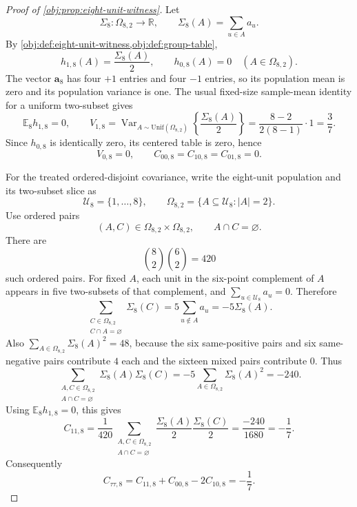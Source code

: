\documentclass[11pt]{article}
\begin{document}
\begin{proof}[Proof of \cref{obj:prop:eight-unit-witness}]
Let
\[
\Sigma_8:\Omega_{8,2}\to\mathbb R,
\qquad
\Sigma_8(A)=\sum_{u\in A} a_u .
\]
By \cref{obj:def:eight-unit-witness,obj:def:group-table},
\[
h_{1,8}(A)=\frac{\Sigma_8(A)}{2},
\qquad
h_{0,8}(A)=0
\quad (A\in\Omega_{8,2}).
\]
The vector \(\mathbf a_8\) has four \(+1\) entries and four \(-1\) entries, so its population mean is zero and its population variance is one. The usual fixed-size sample-mean identity for a uniform two-subset gives
\[
\mathbb E_8 h_{1,8}=0,
\qquad
V_{1,8}
=
\operatorname{Var}_{A\sim\mathrm{Unif}(\Omega_{8,2})}
  \left\{\frac{\Sigma_8(A)}{2}\right\}
=
\frac{8-2}{2(8-1)}\cdot 1
=
\frac{3}{7}.
\]
Since \(h_{0,8}\) is identically zero, its centered table is zero, hence
\[
V_{0,8}=0,
\qquad
C_{00,8}=C_{10,8}=C_{01,8}=0 .
\]

For the treated ordered-disjoint covariance, write the eight-unit population and its two-subset slice as
\[
\mathcal U_8=\{1,\ldots,8\},
\qquad
\Omega_{8,2}=\{A\subseteq\mathcal U_8: |A|=2\}.
\]
Use ordered pairs
\[
(A,C)\in\Omega_{8,2}\times\Omega_{8,2},
\qquad
A\cap C=\varnothing .
\]
There are
\[
\binom82\binom62=420
\]
such ordered pairs. For fixed \(A\), each unit in the six-point complement of \(A\) appears in five two-subsets of that complement, and \(\sum_{u\in\mathcal U_8}a_u=0\). Therefore
\[
\sum_{\substack{C\in\Omega_{8,2}\\ C\cap A=\varnothing}}\Sigma_8(C)
=
5\sum_{u\notin A}a_u
=
-5\Sigma_8(A).
\]
Also \(\sum_{A\in\Omega_{8,2}}\Sigma_8(A)^2=48\), because the six same-positive pairs and six same-negative pairs contribute \(4\) each and the sixteen mixed pairs contribute \(0\). Thus
\[
\sum_{\substack{A,C\in\Omega_{8,2}\\ A\cap C=\varnothing}}
\Sigma_8(A)\Sigma_8(C)
=
-5\sum_{A\in\Omega_{8,2}}\Sigma_8(A)^2
=
-240.
\]
Using \(\mathbb E_8h_{1,8}=0\), this gives
\[
C_{11,8}
=
\frac1{420}
\sum_{\substack{A,C\in\Omega_{8,2}\\ A\cap C=\varnothing}}
\frac{\Sigma_8(A)}2\frac{\Sigma_8(C)}2
=
\frac{-240}{1680}
=
-\frac17 .
\]
Consequently
\[
C_{\tau\tau,8}
=
C_{11,8}+C_{00,8}-2C_{10,8}
=
-\frac17 .
\]


\end{proof}
\end{document}
